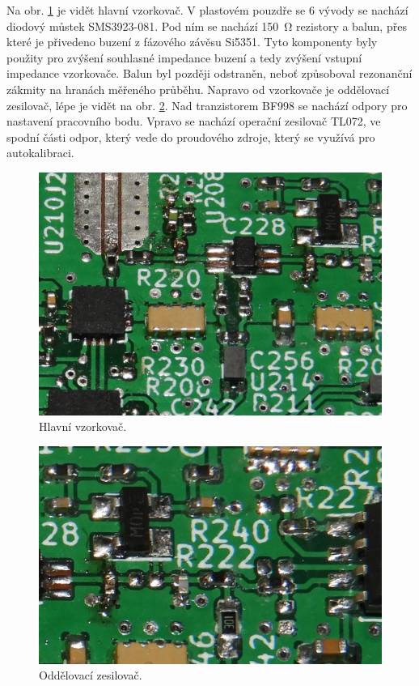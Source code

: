 Na obr. \ref{pcb_main_sampler} je vidět hlavní vzorkovač. V plastovém pouzdře se 6 vývody se nachází diodový můstek SMS3923-081. Pod ním se nachází \SI{150}{\ohm} rezistory a balun, přes které je přivedeno buzení z fázového závěsu Si5351. Tyto komponenty byly použity pro zvýšení souhlasné impedance buzení a tedy zvýšení vstupní impedance vzorkovače. Balun byl později odstraněn, neboť způsoboval rezonanční zákmity na hranách měřeného průběhu. Napravo od vzorkovače je oddělovací zesilovač, lépe je vidět na obr. \ref{pcb_buffer}. Nad tranzistorem BF998 se nachází odpory pro nastavení pracovního bodu. Vpravo se nachází operační zesilovač TL072, ve spodní části odpor, který vede do proudového zdroje, který se využívá pro autokalibraci.
\begin{figure}[htbp]
\includegraphics[width=\textwidth,keepaspectratio]{images/pcb/pcb_main_sampler.jpg}\caption{Hlavní vzorkovač.}\label{pcb_main_sampler}
\end{figure}

\begin{figure}[htbp]
\includegraphics[width=\textwidth,keepaspectratio]{images/pcb/pcb_buffer.jpg}\caption{Oddělovací zesilovač.}\label{pcb_buffer}
\end{figure}

